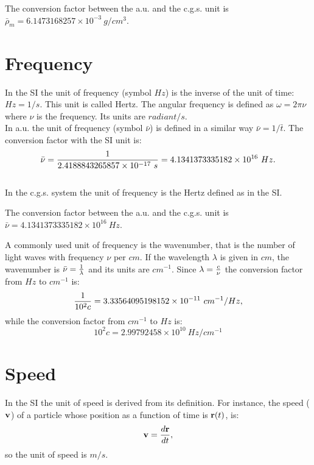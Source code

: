 \documentclass[12pt,a4paper]{article}
\def\bart{2.4188843265857\times 10^{-17}}
\def\barnu{4.1341373335182\times 10^{16}}
\def\barrhomcgs{6.1473168257\times 10^{-3}}
\def\hzcmm1{3.33564095198152\times 10^{-11}}
\def\cmm1hz{2.99792458\times 10^{10}}
\begin{document}
{\color{green} The conversion factor between the a.u. and the c.g.s. unit is
$\bar \rho_m=\barrhomcgs\ g/cm^3$.
}

\newpage
\section{\color{coral}Frequency}

In the SI the unit of frequency (symbol $Hz$) is the inverse
of the unit of time: $Hz=1/s$. This unit is called Hertz.
The angular frequency is defined as $\omega = 2 \pi \nu$ where 
$\nu$ is the frequency. Its units are $radiant/s$.
\\

{\color{web-blue} In a.u. the unit of frequency (symbol $\bar \nu$) is defined
in a similar way $\bar \nu= 1/\bar t$. The conversion factor with the 
SI unit is:
\begin{equation}
\bar \nu = {1 \over \bart\ s}=\barnu\ Hz.
\end{equation}
}
\\

{\color{orange} In the c.g.s. system the unit of frequency is the Hertz 
defined as in the SI.
\\
}

{\color{green} The conversion factor between the a.u. and the c.g.s. unit is
$\bar \nu=\barnu\ Hz$.
\\
}

{\color{red}
A commonly used unit of frequency is the wavenumber, that is the number of 
light waves with frequency $\nu$ per $cm$. If the wavelength $\lambda$ is
given in $cm$, the wavenumber is $\bar \nu={1\over \lambda}$ and its units
are $cm^{-1}$. Since $\lambda={c\over \nu}$ the conversion factor
from $Hz$ to $cm^{-1}$ is:
\begin{equation}
{1\over 10^2 c}=\hzcmm1\ cm^{-1}/Hz,
\end{equation}
while the conversion factor from $cm^{-1}$ to $Hz$ is:
\begin{equation}
10^2 c=\cmm1hz\ Hz/cm^{-1}
\end{equation}
}

\newpage
\section{\color{coral}Speed}
In the SI the unit of speed is derived from its definition.
For instance, the speed (${\bf v}$) of a particle 
whose position as a function of time is ${\bf r}(t)$, is:
\begin{equation}
{\bf v}={d{\bf r} \over dt},
\end{equation} 
so the unit of speed is $m/s$.
\\
\end{document}
